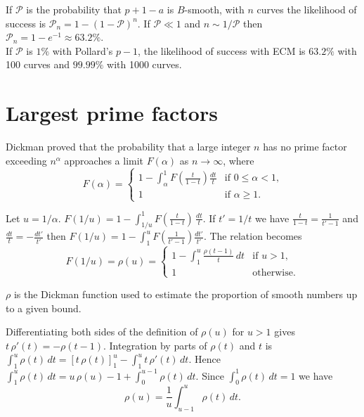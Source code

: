 \documentclass[a4paper, 11pt, pdftex]{report}
\theoremstyle{plain}
\theoremstyle{definition}
\begin{document}
If $\mathcal{P}$ is the probability that $p + 1 - a$ is $B$-smooth, with $n$ curves
the likelihood of success is $\mathcal{P}_n = 1 - (1 - \mathcal{P})^n$. If $\mathcal{P} \ll 1$
and $n \sim 1/\mathcal{P}$ then $\mathcal{P}_n = 1 - e^{-1} \approx 63.2\% $.\\
If $\mathcal{P}$ is $1\%$ with Pollard's $p - 1$, the likelihood of success with ECM
is $63.2\% $ with 100 curves and $99.99\% $ with 1000 curves.

\section{Largest prime factors} \label{chap:l_prm_fact}

Dickman \cite{Dickman1} proved that the probability that a large integer $n$ has no prime factor
exceeding $n^\alpha$ approaches a limit $F(\alpha)$ as $n \to \infty$, where
\begin{equation*}
F(\alpha) = \begin{cases}
1 - \int_\alpha^1 F \left(\frac{t}{1-t} \right) \frac{dt}{t} & \text{if } 0 \leq \alpha < 1 \text{,}\\
1& \text{if } \alpha \geq 1 \text{.}
\end{cases}
\end{equation*}

Let $u = 1/\alpha$. $F(1/u) = 1 - \int_{1/u}^1 F \left(\frac{t}{1-t} \right)\, \frac{dt}{t}$.
If $t' = 1/t$ we have $\frac{t}{1-t} = \frac{1}{t' - 1}$ and $\frac{dt}{t} = -\frac{dt'}{t'}$
then $F(1/u) = 1 - \int_1^u F \left(\frac{1}{t' - 1} \right) \frac{dt'}{t'}$. The relation becomes
\begin{equation*}
F(1/u) = \rho(u) = \begin{cases}
1 - \int_1^u \frac{\rho(t - 1)}{t}\, dt & \text{if } u > 1 \text{,}\\
1 & \text{otherwise.}
\end{cases}
\end{equation*}

$\rho$ is the Dickman function used to estimate the proportion of smooth numbers up to a given bound.

Differentiating both sides of the definition of $\rho(u)$ for $u > 1$ gives
$t\, \rho'(t) = -\rho(t - 1)$. Integration by parts of $\rho(t)$ and $t$ is
$\int_1^u \rho(t)\, dt = \left[ t\, \rho(t) \right]_1^u - \int_1^u t\, \rho'(t)\, dt$. Hence
$\int_1^u \rho(t)\, dt = u\, \rho(u) - 1 + \int_0^{u-1} \rho(t) \, dt$. Since
$\int_0^1 \rho(t) \, dt = 1$ we have
$$\rho(u) = \frac{1}{u} \int_{u - 1}^u \rho(t)\, dt.$$
\end{document}
